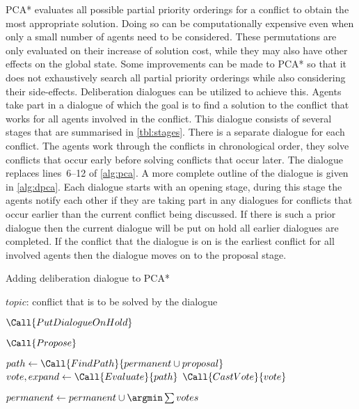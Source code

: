 PCA* evaluates all possible partial priority orderings for a conflict to obtain 
the most appropriate solution. Doing so can be computationally expensive even 
when only a small number of agents need to be considered. These permutations 
are only evaluated on their increase of solution cost, while they may also have 
other effects on the global state. Some improvements can be made to PCA* so 
that it does not exhaustively search all partial priority orderings while also 
considering their side-effects. Deliberation dialogues can be utilized to 
achieve this.
Agents take part in a dialogue of which the goal is to find a solution to the
conflict that works for all agents involved in the conflict. This dialogue
consists of several stages that are summarised in \autoref{tbl:stages}. There 
is a separate dialogue for each conflict. The agents work through the
conflicts in chronological order, they solve conflicts that occur early before
solving conflicts that occur later. The dialogue replaces lines~6--12 of 
\autoref{alg:pca}. A more complete outline of the dialogue is given in 
\autoref{alg:dpca}.
Each dialogue starts with an opening stage, during this stage the agents notify 
each other if they are taking part
in any dialogues for conflicts that occur earlier than the current conflict
being discussed. If there is such a prior dialogue then the current dialogue
will be put on hold all earlier dialogues are completed. If the conflict that
the dialogue is on is the earliest conflict for all involved agents then the
dialogue moves on to the proposal stage.

\begin{algorithm}[t]
    \caption{Adding deliberation dialogue to PCA*}
    \label{alg:dpca}
    \begin{algorithmic}[1]
        \Require $topic$: conflict that is to be solved by the dialogue
        
        
        \State $\Call{PutDialogueOnHold}$
        \EndIf
        
        
        \Repeat
        \State $\Call{Propose}$
        
        
        \State $path \gets \Call{FindPath}{permanent \cup proposal}$
        \State $vote, expand \gets \Call{Evaluate}{path}$
        \State $\Call{CastVote}{vote}$
        \EndFor
        
        
        \State $permanent \gets permanent \cup {\argmin \sum votes}$
    \end{algorithmic}
\end{algorithm}

